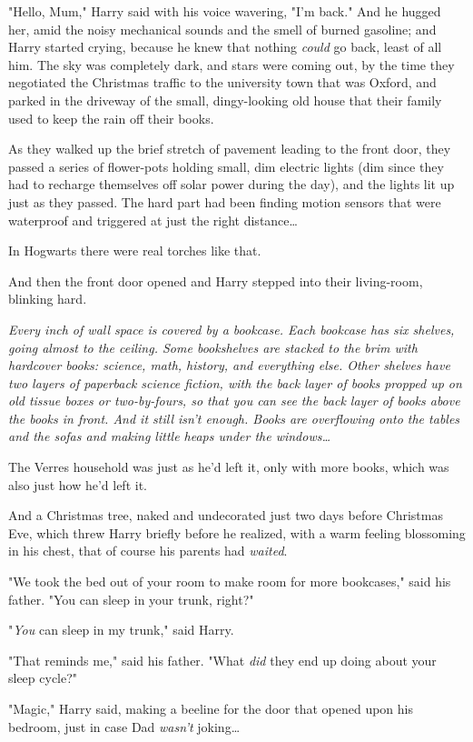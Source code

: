 "Hello, Mum," Harry said with his voice wavering, "I'm back." And he hugged
her, amid the noisy mechanical sounds and the smell of burned gasoline; and
Harry started crying, because he knew that nothing \emph{could} go back, least
of all him.
\sbreak
The sky was completely dark, and stars were coming out, by the time they
negotiated the Christmas traffic to the university town that was Oxford, and
parked in the driveway of the small, dingy-looking old house that their family
used to keep the rain off their books.

As they walked up the brief stretch of pavement leading to the front door, they
passed a series of flower-pots holding small, dim electric lights (dim since
they had to recharge themselves off solar power during the day), and the lights
lit up just as they passed. The hard part had been finding motion sensors that
were waterproof and triggered at just the right distance{\ldots}

In Hogwarts there were real torches like that.

And then the front door opened and Harry stepped into their living-room,
blinking hard.

\emph{Every inch of wall space is covered by a bookcase. Each bookcase has six
shelves, going almost to the ceiling. Some bookshelves are stacked to the brim
with hardcover books: science, math, history, and everything else. Other
shelves have two layers of paperback science fiction, with the back layer of
books propped up on old tissue boxes or two-by-fours, so that you can see the
back layer of books above the books in front. And it still isn't enough. Books
are overflowing onto the tables and the sofas and making little heaps under the
windows{\ldots}}

The Verres household was just as he'd left it, only with more books, which was
also just how he'd left it.

And a Christmas tree, naked and undecorated just two days before Christmas Eve,
which threw Harry briefly before he realized, with a warm feeling blossoming in
his chest, that of course his parents had \emph{waited}.

"We took the bed out of your room to make room for more bookcases," said his
father. "You can sleep in your trunk, right?"

"\emph{You} can sleep in my trunk," said Harry.

"That reminds me," said his father. "What \emph{did} they end up doing about
your sleep cycle?"

"Magic," Harry said, making a beeline for the door that opened upon his
bedroom, just in case Dad \emph{wasn't} joking{\ldots}

